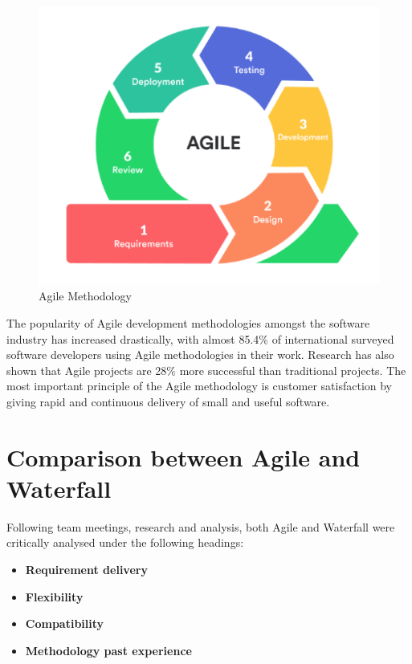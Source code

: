 \begin{figure}[ht]
    \centering
    \includegraphics[scale=0.8]{img/Agile.png}
    \caption{Agile Methodology}
    \label{fig:my_label1}
\end{figure}

The popularity of Agile development methodologies amongst the software industry has increased drastically, with almost 85.4\% of international surveyed software developers using Agile methodologies in their work. Research has also shown that Agile projects are 28\% more successful than traditional projects. The most important principle of the Agile methodology is customer satisfaction by giving rapid and continuous delivery of small and useful software.\cite{PopularityofAgile}



\section{Comparison between Agile and Waterfall}
Following team meetings, research and analysis, both Agile and Waterfall were critically analysed under the following headings:

\begin{itemize}

    \item \textbf{Requirement delivery}

    \item \textbf{Flexibility}

    \item \textbf{Compatibility}

     \item \textbf{Methodology past experience}

\end{itemize}

